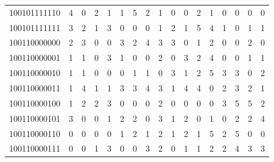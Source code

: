 \documentclass[10pt,a4paper]{article}
\begin{document}
\begin{longtable}{ |c|c|c|c|c|c|c|c|c|c|c|c|c|c|c|c|c| }
    100101111110              & 4                            & 0                                & 2                            & 1                              & 1   & 5   & 2   & 1   & 0   & 0   & 2   & 1   & 0   & 0   & 0   & 0   \\
    100101111111              & 3                            & 2                                & 1                            & 3                              & 0   & 0   & 0   & 1   & 2   & 1   & 5   & 4   & 1   & 0   & 1   & 1   \\
    100110000000              & 2                            & 3                                & 0                            & 0                              & 3   & 2   & 4   & 3   & 3   & 0   & 1   & 2   & 0   & 0   & 2   & 0   \\
    100110000001              & 1                            & 1                                & 0                            & 3                              & 1   & 0   & 0   & 2   & 0   & 3   & 2   & 4   & 0   & 0   & 1   & 1   \\
    100110000010              & 1                            & 1                                & 0                            & 0                              & 0   & 1   & 1   & 0   & 3   & 1   & 2   & 5   & 3   & 3   & 0   & 2   \\
    100110000011              & 1                            & 4                                & 1                            & 1                              & 3   & 3   & 4   & 3   & 1   & 4   & 4   & 0   & 2   & 3   & 2   & 1   \\
    100110000100              & 1                            & 2                                & 2                            & 3                              & 0   & 0   & 0   & 2   & 0   & 0   & 0   & 0   & 3   & 5   & 5   & 2   \\
    100110000101              & 3                            & 0                                & 0                            & 1                              & 2   & 2   & 0   & 3   & 1   & 2   & 0   & 1   & 0   & 2   & 2   & 4   \\
    100110000110              & 0                            & 0                                & 0                            & 0                              & 1   & 2   & 1   & 2   & 1   & 2   & 1   & 5   & 2   & 5   & 0   & 0   \\
    100110000111              & 0                            & 0                                & 1                            & 3                              & 0   & 0   & 3   & 2   & 0   & 1   & 1   & 2   & 2   & 4   & 3   & 3   \\

\end{longtable}
\end{document}
